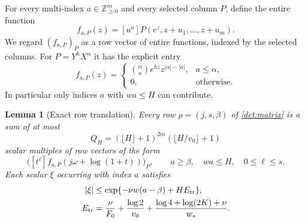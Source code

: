 \documentclass[11pt]{article}
\newcommand{\ZZ}{\mathbb Z}
\newtheorem{lemma}[theorem]{Lemma}
\theoremstyle{definition}
\theoremstyle{remark}
\numberwithin{equation}{section}
\begin{document}
For every multi-index $a\in\ZZ_{\ge0}^m$ and every selected column $P$,
define the entire function
\begin{equation}
 f_{a,P}(z)=[u^a]P(e^z,z+u_1,\ldots,z+u_m).
 \label{det:test-functions}
\end{equation}
We regard $(f_{a,P})_P$ as a row vector of entire functions, indexed by
the selected columns.  For $P=Y^hX^\alpha$ it has the explicit entry
\begin{equation}
 f_{a,P}(z)=
 \begin{cases}
 \displaystyle\binom{\alpha}{a}e^{hz}z^{|\alpha|-|a|},&a\le\alpha,\\
 0,&\text{otherwise}.
 \end{cases}
 \label{det:test-monomials}
\end{equation}
In particular only indices $a$ with $wa\le H$ can contribute.

\begin{lemma}[Exact row translation]\label{det:translation}
Every row $\rho=(j,s,\beta)$ of \eqref{det:matrix} is a sum of at most
\begin{equation}
 Q_H=(\lfloor H\rfloor+1)^{2m}
          (\lfloor H/v_0\rfloor+1)
 \label{det:term-count}
\end{equation}
scalar multiples of row vectors of the form
\[
 \bigl([t^\ell]f_{a,P}(j\omega+\log(1+t))\bigr)_P,
 \qquad a\ge\beta,\quad wa\le H,\quad0\le\ell\le s.
\]
Each scalar $\xi$ occurring with index $a$ satisfies
\begin{equation}
 \begin{aligned}
 |\xi|&\le\exp\{-\nu w(a-\beta)+H E_{\rm tr}\},\\
 E_{\rm tr}
 &=\frac{\nu}{F_0}+\frac{\log2}{v_0}
   +\frac{\log4+\log(2K)+\nu}{w_*}.
 \end{aligned}
 \label{det:translation-bound}
\end{equation}
\end{lemma}
\end{document}
